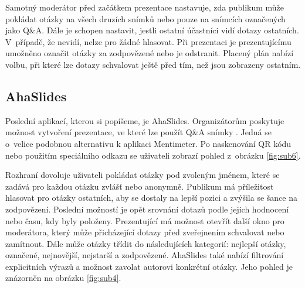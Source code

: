 Samotný moderátor před začátkem prezentace nastavuje, zda publikum může pokládat otázky na všech druzích snímků nebo pouze na snímcích označených jako Q\&A. Dále je schopen nastavit, jestli ostatní účastníci vidí dotazy ostatních. V~případě, že nevidí, nelze pro žádné hlasovat. Při prezentaci je prezentujícímu umožněno označit otázky za zodpovězené nebo je odstranit. Placený plán nabízí volbu, při které lze dotazy schvalovat ještě před tím, než jsou zobrazeny ostatním.

\subsection{AhaSlides}
Poslední aplikací, kterou si popíšeme, je AhaSlides. Organizátorům poskytuje možnost vytvoření prezentace, ve které lze použít Q\&A snímky \cite{ahasection}. Jedná se o~velice podobnou alternativu k aplikaci Mentimeter. Po naskenování QR kódu nebo použitím speciálního odkazu se uživateli zobrazí pohled z~obrázku \ref{fig:sub6}.

Rozhraní dovoluje uživateli pokládat otázky pod zvoleným jménem, které se zadává pro každou otázku zvlášť nebo anonymně. Publikum má příležitost hlasovat pro otázky ostatních, aby se dostaly na lepší pozici a zvýšila se šance na zodpovězení. Poslední možností je opět srovnání dotazů podle jejich hodnocení nebo času, kdy byly položeny.
Prezentující má možnost otevřít další okno pro moderátora, který může přicházející dotazy před zveřejnením schvalovat nebo zamítnout. Dále může otázky třídit do následujících kategorií: nejlepší otázky, označené, nejnovější, nejstarší a zodpovězené. AhaSlides také nabízí filtrování explicitních výrazů a možnost zavolat autorovi konkrétní otázky. Jeho pohled je znázorněn na obrázku \ref{fig:sub4}.

